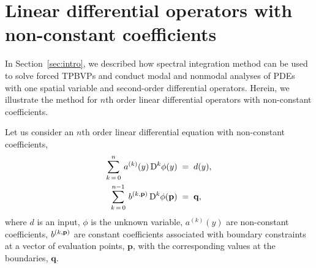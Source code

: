 \documentclass[%
secnumarabic,%
 amssymb, amsmath,%
 aps,prf,superscriptaddress,longbibliography
frontmatterverbose,
]{revtex4-2}
\begin{document}
	\vspace*{-4ex}
\section{Linear differential operators with non-constant coefficients}
	\label{sec.main}

	\vspace*{-2ex}
In Section~\ref{sec:intro}, we described how spectral integration method can be used to solve forced TPBVPs and conduct modal and nonmodal analyses of PDEs with one spatial variable and second-order differential operators. Herein, we illustrate the method for $n$th order linear differential operators with non-constant coefficients. 

Let us consider an $n$th order linear differential equation with non-constant coefficients,
\begin{subequations}\label{eq1:1}
\begin{align}
    \sum_{k \, = \, 0}^{n}\, a^{(k)}(y)\, \mathrm D^k \phi (y) \;&=\; d(y),\label{eq:1a}\\
    \sum_{k \, = \, 0}^{n-1}\,b^{(k,\mathbf p)} \, \mathrm D^k \phi (\mathbf p) \;&=\; \mathbf q,\label{eq:1b}
\end{align}
\end{subequations}
where $d$ is an input, $\phi$ is the unknown variable, $a^{(k)} (y)$ are non-constant coefficients, $b^{(k,\mathbf{p})}$ are constant coefficients associated with boundary constraints at a vector of evaluation points, $\mathbf p$, with the corresponding values at the boundaries, $\mathbf q$. 
\end{document}
